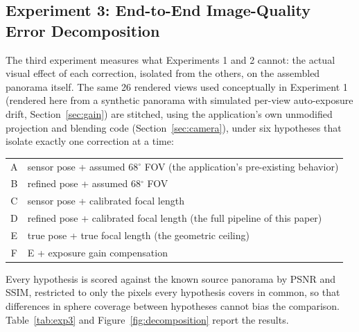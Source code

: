 \documentclass[11pt]{article}
\newcommand{\Deg}{\ensuremath{^{\circ}}}
\begin{document}
\subsection{Experiment 3: End-to-End Image-Quality Error Decomposition}
\label{sec:eval3}

The third experiment measures what Experiments 1 and 2 cannot: the actual visual effect of each correction, isolated from the others, on the assembled panorama itself. The same 26 rendered views used conceptually in Experiment 1 (rendered here from a synthetic panorama with simulated per-view auto-exposure drift, Section~\ref{sec:gain}) are stitched, using the application's own unmodified projection and blending code (Section~\ref{sec:camera}), under six hypotheses that isolate exactly one correction at a time:

\begin{center}
\small
\begin{tabular}{@{}cl@{}}
A & sensor pose + assumed $68\Deg$ FOV (the application's pre-existing behavior) \\
B & refined pose + assumed $68\Deg$ FOV \\
C & sensor pose + calibrated focal length \\
D & refined pose + calibrated focal length (the full pipeline of this paper) \\
E & true pose + true focal length (the geometric ceiling) \\
F & E + exposure gain compensation \\
\end{tabular}
\end{center}

Every hypothesis is scored against the known source panorama by PSNR and SSIM, restricted to only the pixels every hypothesis covers in common, so that differences in sphere coverage between hypotheses cannot bias the comparison. Table~\ref{tab:exp3} and Figure~\ref{fig:decomposition} report the results.
\end{document}

